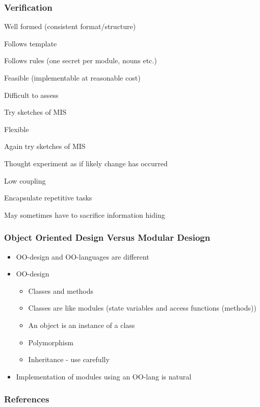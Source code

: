 \documentclass[t,12pt,numbers,fleqn]{beamer}
\begin{document}

\begin{frame}
\frametitle{Verification}

\bi
\item Well formed (consistent format/structure)
\bi
\item Follows template
\item Follows rules (one secret per module, nouns etc.)
\ei
\item Feasible (implementable at reasonable cost)
\bi
\item Difficult to assess
\item Try sketches of MIS
\ei
\item Flexible
\bi
\item Again try sketches of MIS
\item Thought experiment as if likely change has occurred
\item Low coupling
\item Encapsulate repetitive tasks
\ei
\item May sometimes have to sacrifice information hiding
\ei

\end{frame}


\begin{frame}
\frametitle{Object Oriented Design Versus Modular Desiogn}
\begin{itemize}
\item OO-design and OO-languages are different
\item OO-design
\begin{itemize}
\item Classes and methods
\item Classes are like modules (state variables and access functions (methods))
\item An object is an instance of a class
\item Polymorphism
\item Inheritance - use carefully
\end{itemize}
\item Implementation of modules using an OO-lang is natural
\end{itemize}
\end{frame}


\begin{frame}[allowframebreaks]
\frametitle{References}



\end{frame}

\end{document}
